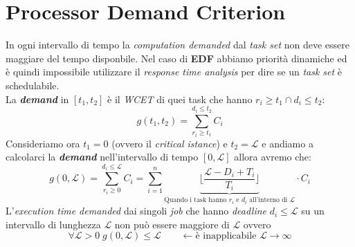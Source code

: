 \section{Processor Demand Criterion}
In ogni intervallo di tempo la \textit{computation demanded} dal \textit{task set} non deve essere maggiare del tempo disponbile. Nel caso di \textbf{EDF} abbiamo priorità dinamiche ed è quindi impossibile utilizzare il \textit{response time analysis} per dire se un \textit{task set} è schedulabile. \\
La \textbf{\textit{demand}} in $[t_1, t_2]$ è il \textit{WCET} di quei task che hanno $r_i \geq t_1 \cap d_i \leq t_2$: \[ g(t_1, t_2) = \sum_{r_i \geq t_1}^{d_i \leq t_2} C_i\]
Consideriamo ora $t_1 = 0$ (ovvero il \textit{critical istance}) e $t_2 = \mathcal{L}$ e andiamo a calcolarci la \textbf{\textit{demand}} nell'intervallo di tempo $[0, \mathcal{L}]$ allora avremo che: \[g(0, \mathcal{L}) = \sum_{r_i \geq 0}^{d_i \leq \mathcal{L}} C_i = \sum_{i=1}^n \underbrace{\lfloor \frac{\mathcal{L} - D_i + T_i}{T_i} \rfloor}_{\text{Quando i task hanno }r_i\text{ e }d_i \text{ all'interno di }\mathcal{L}} \cdot C_i\]
L'\textit{execution time demanded} dai singoli \textit{job} che hanno \textit{deadline} $d_i \leq \mathcal{L}$ su un intervallo di lunghezza $\mathcal{L}$ non può essere maggiore di $\mathcal{L}$ ovvero \[ \forall \mathcal{L} > 0 \; g(0, \mathcal{L}) \leq \mathcal{L} \qquad \leftarrow \text{è inapplicabile } \mathcal{L} \rightarrow \infty \]
